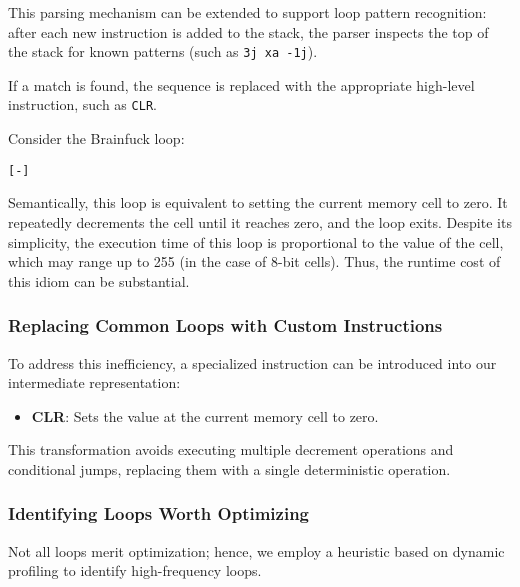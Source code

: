 \par This parsing mechanism can be extended to support loop pattern recognition: after each new instruction is added to the stack, the parser inspects the top of the stack for known patterns (such as \texttt{3j xa -1j}).

\par If a match is found, the sequence is replaced with the appropriate high-level instruction, such as \texttt{CLR}.
\par Consider the Brainfuck loop:

\begin{verbatim}
[-]
\end{verbatim}

\par Semantically, this loop is equivalent to setting the current memory cell to zero. It repeatedly decrements the cell until it reaches zero, and the loop exits. Despite its simplicity, the execution time of this loop is proportional to the value of the cell, which may range up to 255 (in the case of 8-bit cells). Thus, the runtime cost of this idiom can be substantial.

\subsubsection*{Replacing Common Loops with Custom Instructions}

\par To address this inefficiency, a specialized instruction can be introduced into our intermediate representation:

\begin{itemize}
    \item \textbf{CLR}: Sets the value at the current memory cell to zero.
\end{itemize}

\par This transformation avoids executing multiple decrement operations and conditional jumps, replacing them with a single deterministic operation.

\subsubsection*{Identifying Loops Worth Optimizing}

\par Not all loops merit optimization; hence, we employ a heuristic based on dynamic profiling to identify high-frequency loops.

